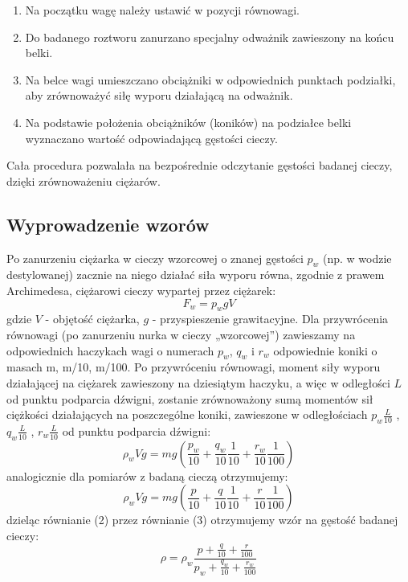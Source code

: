 \documentclass{article} %
\begin{document}
\begin{enumerate}
    \item Na początku wagę należy ustawić w pozycji równowagi.
    \item Do badanego roztworu zanurzano specjalny odważnik zawieszony na końcu belki.
    \item Na belce wagi umieszczano obciążniki w odpowiednich punktach podziałki, aby zrównoważyć siłę wyporu działającą na odważnik.
    \item Na podstawie położenia obciążników (koników) na podziałce belki wyznaczano wartość odpowiadającą gęstości cieczy.
\end{enumerate}


Cała procedura pozwalała na bezpośrednie odczytanie gęstości badanej cieczy, dzięki zrównoważeniu ciężarów.

\subsection{Wyprowadzenie wzorów}

Po zanurzeniu ciężarka w cieczy wzorcowej o znanej gęstości $p_w$ (np. w wodzie
destylowanej) zacznie na niego działać siła wyporu równa, zgodnie z prawem
Archimedesa, ciężarowi cieczy wypartej przez ciężarek:
{\large
    \begin{equation}
    F_w = p_wgV    
    \end{equation}
}
gdzie $V$ - objętość ciężarka, $g$ - przyspieszenie grawitacyjne.  Dla przywrócenia równowagi (po zanurzeniu nurka w cieczy „wzorcowej”) zawieszamy na odpowiednich haczykach wagi o numerach $p_w$, 
$q_w$ i $r_w$ odpowiednie koniki o masach m, m/10, m/100. Po przywróceniu równowagi,
moment siły wyporu działającej na ciężarek zawieszony na dziesiątym haczyku,
a więc w odległości $L$ od punktu podparcia dźwigni, zostanie zrównoważony sumą momentów sił ciężkości działających na poszczególne koniki, zawieszone w
odległościach $p_w \frac{L}{10}$ , $q_w \frac{L}{10}$ , $r_w \frac{L}{10}$ od punktu podparcia dźwigni:
{\large
    \begin{equation}
    \rho_wVg = mg(\frac{p_w}{10}+\frac{q_w}{10}\frac{1}{10}+\frac{r_w}{10}\frac{1}{100})
    \end{equation}
}
analogicznie dla pomiarów z badaną cieczą otrzymujemy:
{\large
    \begin{equation}
    \rho_wVg = mg(\frac{p}{10}+\frac{q}{10}\frac{1}{10}+\frac{r}{10}\frac{1}{100})
    \end{equation}
}
dzieląc równianie (2) przez równianie (3) otrzymujemy wzór na gęstość badanej cieczy:
{\large
    \begin{equation}
    \rho = \rho_w\frac{p+\frac{q}{10}+\frac{r}{100}}{p_w+\frac{q_w}{10}+\frac{r_w}{100}}
    \end{equation}
}
\end{document}

